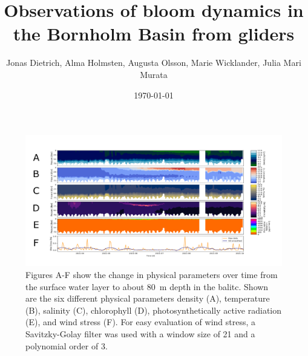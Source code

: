 \documentclass{article}
\title{Observations of bloom dynamics in the Bornholm Basin from gliders}
\author{Jonas Dietrich, Alma Holmsten, Augusta Olsson, Marie Wicklander, Julia Mari Murata}
\date{\today}
\begin{document}
\maketitle



\begin{multicols}{2}



\end{multicols}

\begin{figure}[H]
  \centering
    \includegraphics[width=\textwidth]{All_Properties.png}
\caption{Figures A-F show the change in physical parameters over time from the surface water layer to about \SI{80}{m} depth in the balitc. 
Shown are the six different physical parameters density (A), temperature (B),
salinity (C), chlorophyll (D), photosynthetically active radiation (E), and wind stress (F). For easy evaluation of wind stress, a Savitzky-Golay filter was used with a window size of 21 and a polynomial order of 3.}
  \label{fig:all}
\end{figure}

\begin{multicols}{2}


\printbibliography
\end{multicols}


%
\end{document}
